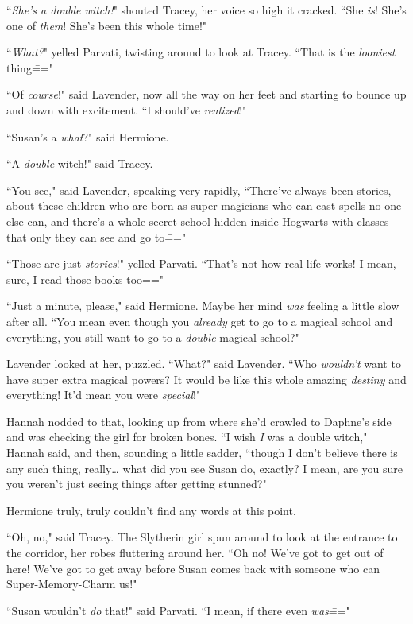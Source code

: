 ``\emph{She's a double witch!}" shouted Tracey, her voice so high it cracked. ``She \emph{is}! She's one of \emph{them}! She's been this whole time!"

``\emph{What?}" yelled Parvati, twisting around to look at Tracey. ``That is the \emph{looniest} thing\==="

``Of \emph{course}!" said Lavender, now all the way on her feet and starting to bounce up and down with excitement. ``I should've \emph{realized}!"

``Susan's a \emph{what}?" said Hermione.

``A \emph{double} witch!" said Tracey.

``You see," said Lavender, speaking very rapidly, ``There've always been stories, about these children who are born as super magicians who can cast spells no one else can, and there's a whole secret school hidden inside Hogwarts with classes that only they can see and go to\==="

``Those are just \emph{stories}!" yelled Parvati. ``That's not how real life works! I mean, sure, I read those books too\==="

``Just a minute, please," said Hermione. Maybe her mind \emph{was} feeling a little slow after all. ``You mean even though you \emph{already} get to go to a magical school and everything, you still want to go to a \emph{double} magical school?"

Lavender looked at her, puzzled. ``What?" said Lavender. ``Who \emph{wouldn't} want to have super extra magical powers? It would be like this whole amazing \emph{destiny} and everything! It'd mean you were \emph{special}!"

Hannah nodded to that, looking up from where she'd crawled to Daphne's side and was checking the girl for broken bones. ``I wish \emph{I} was a double witch," Hannah said, and then, sounding a little sadder, ``though I don't believe there is any such thing, really{\ldots} what did you see Susan do, exactly? I mean, are you sure you weren't just seeing things after getting stunned?"

Hermione truly, truly couldn't find any words at this point.

``Oh, no," said Tracey. The Slytherin girl spun around to look at the entrance to the corridor, her robes fluttering around her. ``Oh no! We've got to get out of here! We've got to get away before Susan comes back with someone who can Super-Memory-Charm us!"

``Susan wouldn't \emph{do} that!" said Parvati. ``I mean, if there even \emph{was}\==="

